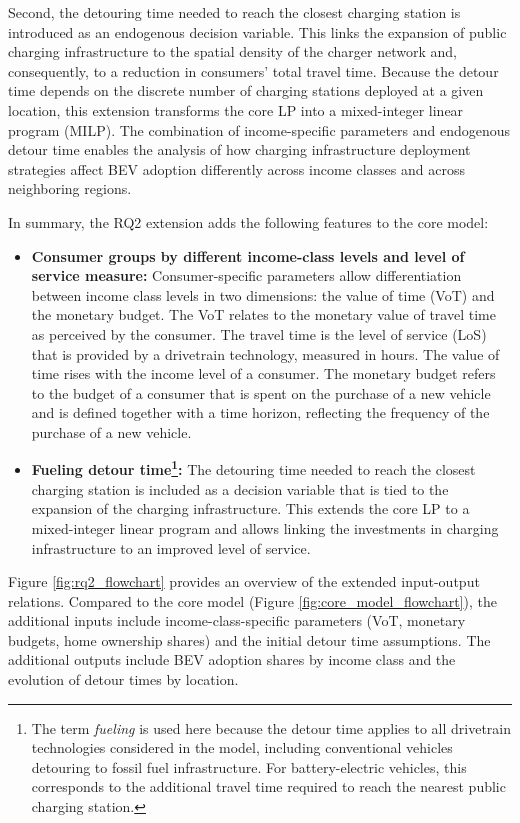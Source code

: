         Second, the detouring time needed to reach the closest charging station is introduced as an endogenous decision variable. This links the expansion of public charging infrastructure to the spatial density of the charger network and, consequently, to a reduction in consumers' total travel time. Because the detour time depends on the discrete number of charging stations deployed at a given location, this extension transforms the core LP into a mixed-integer linear program (MILP). The combination of income-specific parameters and endogenous detour time enables the analysis of how charging infrastructure deployment strategies affect \ac{BEV} adoption differently across income classes and across neighboring regions.

        In summary, the RQ2 extension adds the following features to the core model:
        \begin{itemize}
            \item \textbf{Consumer groups by different income-class levels and level of service measure:} Consumer-specific parameters allow differentiation between income class levels in two dimensions: the value of time (VoT) and the monetary budget. The VoT relates to the monetary value of travel time as perceived by the consumer. The travel time is the level of service (LoS) that is provided by a drivetrain technology, measured in hours. The value of time rises with the income level of a consumer. The monetary budget refers to the budget of a consumer that is spent on the purchase of a new vehicle and is defined together with a time horizon, reflecting the frequency of the purchase of a new vehicle.

            \item \textbf{Fueling detour time\footnote{The term \textit{fueling} is used here because the detour time applies to all drivetrain technologies considered in the model, including conventional vehicles detouring to fossil fuel infrastructure. For battery-electric vehicles, this corresponds to the additional travel time required to reach the nearest public charging station.}:} The detouring time needed to reach the closest charging station is included as a decision variable that is tied to the expansion of the charging infrastructure. This extends the core LP to a mixed-integer linear program and allows linking the investments in charging infrastructure to an improved level of service.
        \end{itemize}

        Figure \ref{fig:rq2_flowchart} provides an overview of the extended input-output relations. Compared to the core model (Figure \ref{fig:core_model_flowchart}), the additional inputs include income-class-specific parameters (VoT, monetary budgets, home ownership shares) and the initial detour time assumptions. The additional outputs include \ac{BEV} adoption shares by income class and the evolution of detour times by location.

